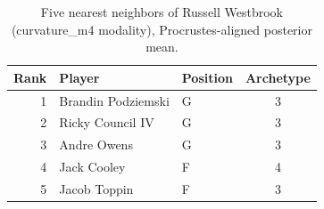\begin{table}[htbp]
  \centering\small
  \begin{tabular}{rllc}
    \toprule
    Rank & Player & Position & Archetype \\
    \midrule
    1 & Brandin Podziemski & G & 3 \\
    2 & Ricky Council IV & G & 3 \\
    3 & Andre Owens & G & 3 \\
    4 & Jack Cooley & F & 4 \\
    5 & Jacob Toppin & F & 3 \\
    \bottomrule
  \end{tabular}
  \caption{Five nearest neighbors of Russell Westbrook (curvature_m4 modality), Procrustes-aligned posterior mean.}
  \label{tab:Russell_Westbrook_neighbors_curvature_m4}
\end{table}

